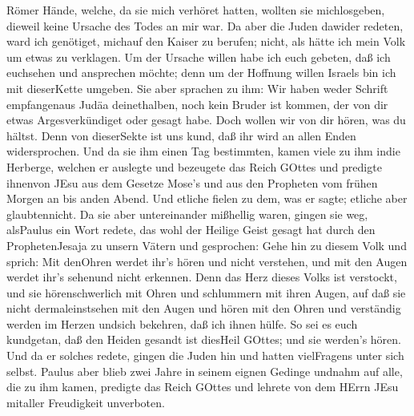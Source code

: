 Römer Hände,  welche, da sie mich verhöret hatten, wollten
sie michlosgeben, dieweil keine Ursache des Todes an mir war.
 Da aber die Juden dawider redeten, ward ich genötiget,
michauf den Kaiser zu berufen; nicht, als hätte ich mein Volk um etwas
zu verklagen.  Um der Ursache willen habe ich euch gebeten,
daß ich euchsehen und ansprechen möchte; denn um der Hoffnung willen
Israels bin ich mit dieserKette umgeben.  Sie aber sprachen
zu ihm: Wir haben weder Schrift empfangenaus Judäa deinethalben, noch
kein Bruder ist kommen, der von dir etwas Argesverkündiget oder gesagt
habe.  Doch wollen wir von dir hören, was du hältst. Denn
von dieserSekte ist uns kund, daß ihr wird an allen Enden widersprochen.
 Und da sie ihm einen Tag bestimmten, kamen viele zu ihm
indie Herberge, welchen er auslegte und bezeugete das Reich GOttes und
predigte ihnenvon JEsu aus dem Gesetze Mose's und aus den Propheten vom
frühen Morgen an bis anden Abend.  Und etliche fielen zu
dem, was er sagte; etliche aber glaubtennicht.  Da sie aber
untereinander mißhellig waren, gingen sie weg, alsPaulus ein Wort
redete, das wohl der Heilige Geist gesagt hat durch den ProphetenJesaja
zu unsern Vätern  und gesprochen: Gehe hin zu diesem Volk
und sprich: Mit denOhren werdet ihr's hören und nicht verstehen, und mit
den Augen werdet ihr's sehenund nicht erkennen.  Denn das
Herz dieses Volks ist verstockt, und sie hörenschwerlich mit Ohren und
schlummern mit ihren Augen, auf daß sie nicht dermaleinstsehen mit den
Augen und hören mit den Ohren und verständig werden im Herzen undsich
bekehren, daß ich ihnen hülfe.  So sei es euch kundgetan,
daß den Heiden gesandt ist diesHeil GOttes; und sie werden's hören.
 Und da er solches redete, gingen die Juden hin und hatten
vielFragens unter sich selbst.  Paulus aber blieb zwei
Jahre in seinem eignen Gedinge undnahm auf alle, die zu ihm kamen,
 predigte das Reich GOttes und lehrete von dem HErrn JEsu
mitaller Freudigkeit unverboten.
